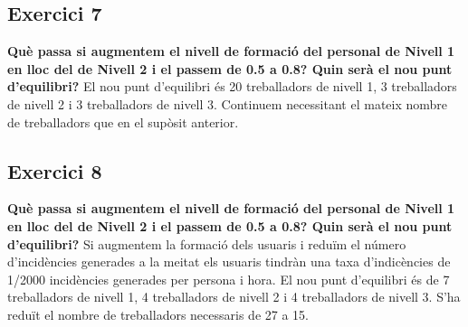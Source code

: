 \documentclass[8pt]{beamer}
\begin{document}
\subsection{Exercici 7}
\begin{frame}
\textbf{Què passa si augmentem el nivell de formació del personal de Nivell 1 en lloc del de Nivell
2 i el passem de 0.5 a 0.8? Quin serà el nou punt d’equilibri?}
\newline
\newline
El nou punt d'equilibri és 20 treballadors de nivell 1, 3 treballadors de nivell 2 i 3 treballadors de nivell 3.
\newline Continuem necessitant el mateix nombre de treballadors que en el supòsit anterior.
\end{frame}

\subsection{Exercici 8}
\begin{frame}
\textbf{Què passa si augmentem el nivell de formació del personal de Nivell 1 en lloc del de Nivell
2 i el passem de 0.5 a 0.8? Quin serà el nou punt d’equilibri?}
\newline
\newline
Si augmentem la formació dels usuaris i reduïm el número d'incidències generades a la meitat els usuaris tindràn una taxa d'indicències de 1/2000 incidències generades per persona i hora.
\newline El nou punt d'equilibri és de 7 treballadors de nivell 1, 4 treballadors de nivell 2 i 4 treballadors de nivell 3.
S'ha reduït el nombre de treballadors necessaris de 27 a 15.
\end{frame}
\end{document}
